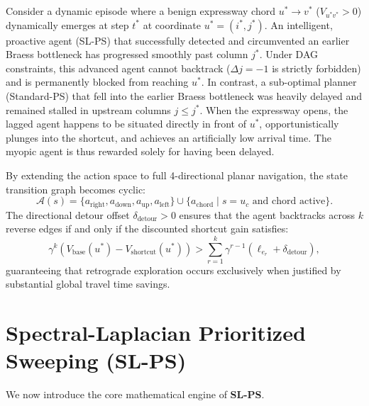 \documentclass[11pt,a4paper]{article}
\begin{document}
Consider a dynamic episode where a benign expressway chord $u^* \to v^*$ ($V_{u^* v^*} > 0$) dynamically emerges at step $t^*$ at coordinate $u^* = (i^*, j^*)$. An intelligent, proactive agent (SL-PS) that successfully detected and circumvented an earlier Braess bottleneck has progressed smoothly past column $j^*$. Under DAG constraints, this advanced agent cannot backtrack ($\Delta j = -1$ is strictly forbidden) and is permanently blocked from reaching $u^*$. In contrast, a sub-optimal planner (Standard-PS) that fell into the earlier Braess bottleneck was heavily delayed and remained stalled in upstream columns $j \le j^*$. When the expressway opens, the lagged agent happens to be situated directly in front of $u^*$, opportunistically plunges into the shortcut, and achieves an artificially low arrival time. The myopic agent is thus rewarded solely for having been delayed.

By extending the action space to full 4-directional planar navigation, the state transition graph becomes cyclic:
\begin{equation}
\mathcal{A}(s) = \{ a_{\text{right}}, a_{\text{down}}, a_{\text{up}}, a_{\text{left}} \} \cup \{ a_{\text{chord}} \mid s = u_c \text{ and chord active} \}.
\end{equation}
The directional detour offset $\delta_{\text{detour}} > 0$ ensures that the agent backtracks across $k$ reverse edges if and only if the discounted shortcut gain satisfies:
\begin{equation}
\label{eq:detour_condition}
\gamma^k \left( V_{\text{base}}(u^*) - V_{\text{shortcut}}(u^*) \right) > \sum_{r=1}^k \gamma^{r-1} \left( \ell_{e_r} + \delta_{\text{detour}} \right),
\end{equation}
guaranteeing that retrograde exploration occurs exclusively when justified by substantial global travel time savings.

\section{Spectral-Laplacian Prioritized Sweeping (SL-PS)}
\label{sec:method}

We now introduce the core mathematical engine of \textbf{SL-PS}.
\end{document}
